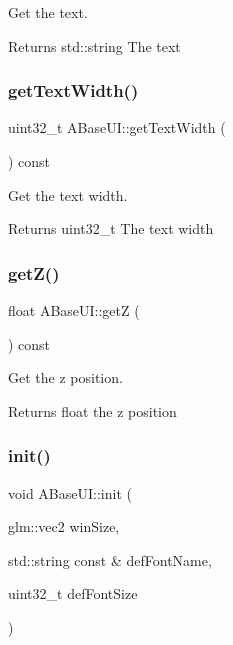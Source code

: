 Get the text. 

\begin{DoxyReturn}{Returns}
std\+::string The text 
\end{DoxyReturn}
\mbox{\label{class_a_base_u_i_a3f0c35baa16ea53b2d43032e48a792e8}} 
\subsubsection{\texorpdfstring{get\+Text\+Width()}{getTextWidth()}}
{\footnotesize\ttfamily uint32\+\_\+t A\+Base\+U\+I\+::get\+Text\+Width (\begin{DoxyParamCaption}{ }\end{DoxyParamCaption}) const\hspace{0.3cm}{\ttfamily [virtual]}}



Get the text width. 

\begin{DoxyReturn}{Returns}
uint32\+\_\+t The text width 
\end{DoxyReturn}
\mbox{\label{class_a_base_u_i_a6759fcda967331612b30f5a473f76da2}} 
\subsubsection{\texorpdfstring{get\+Z()}{getZ()}}
{\footnotesize\ttfamily float A\+Base\+U\+I\+::getZ (\begin{DoxyParamCaption}{ }\end{DoxyParamCaption}) const\hspace{0.3cm}{\ttfamily [virtual]}}



Get the z position. 

\begin{DoxyReturn}{Returns}
float the z position 
\end{DoxyReturn}
\mbox{\label{class_a_base_u_i_a6ddd4c5f9808ccf2c76dc1b22f482a09}} 
\subsubsection{\texorpdfstring{init()}{init()}}
{\footnotesize\ttfamily void A\+Base\+U\+I\+::init (\begin{DoxyParamCaption}\item[{glm\+::vec2}]{win\+Size,  }\item[{std\+::string const \&}]{def\+Font\+Name,  }\item[{uint32\+\_\+t}]{def\+Font\+Size }\end{DoxyParamCaption})\hspace{0.3cm}{\ttfamily [static]}}



